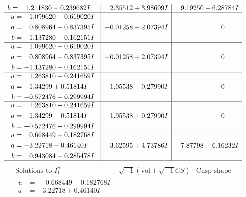\documentclass[1p]{elsarticle_modified}
\theoremstyle{definition}
\newcommand{\I}{\sqrt{-1}}
\begin{document}
$$\begin{array}{c|c|c}
\begin{aligned}
b &= \phantom{-}1.211830 + 0.239682 I\end{aligned}
 & \phantom{-}2.35512 + 3.98609 I & \phantom{-}9.19250 - 6.28784 I \\ \hline\begin{aligned}
u &= \phantom{-}1.099620 + 0.619020 I \\
a &= \phantom{-}0.808964 - 0.837395 I \\
b &= -1.137280 + 0.162151 I\end{aligned}
 & -0.01258 - 2.07394 I & \phantom{-0.000000 } 0 \\ \hline\begin{aligned}
u &= \phantom{-}1.099620 - 0.619020 I \\
a &= \phantom{-}0.808964 + 0.837395 I \\
b &= -1.137280 - 0.162151 I\end{aligned}
 & -0.01258 + 2.07394 I & \phantom{-0.000000 } 0 \\ \hline\begin{aligned}
u &= \phantom{-}1.263810 + 0.241659 I \\
a &= \phantom{-}1.34299 + 0.51814 I \\
b &= -0.572476 - 0.299994 I\end{aligned}
 & -1.95538 - 0.27990 I & \phantom{-0.000000 } 0 \\ \hline\begin{aligned}
u &= \phantom{-}1.263810 - 0.241659 I \\
a &= \phantom{-}1.34299 - 0.51814 I \\
b &= -0.572476 + 0.299994 I\end{aligned}
 & -1.95538 + 0.27990 I & \phantom{-0.000000 } 0 \\ \hline\begin{aligned}
u &= \phantom{-}0.668449 + 0.182768 I \\
a &= -3.22718 - 0.46140 I \\
b &= \phantom{-}0.943084 + 0.285478 I\end{aligned}
 & -3.62595 + 4.73786 I & \phantom{-}7.87798 - 6.16232 I\\
 \hline 
 \end{array}$$\newpage$$\begin{array}{c|c|c}  
\text{Solutions to }I^u_{1}& \I (\text{vol} + \sqrt{-1}CS) & \text{Cusp shape}\\
 \hline 
\begin{aligned}
u &= \phantom{-}0.668449 - 0.182768 I \\
a &= -3.22718 + 0.46140 I \\

\end{aligned}
\end{array}$$
\end{document}
